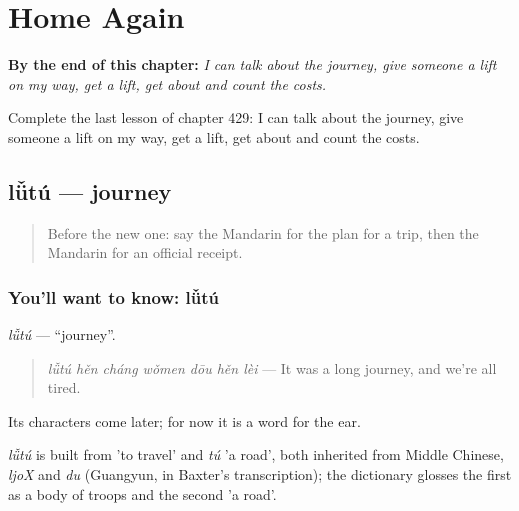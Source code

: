 
\chapter{Home Again}
\label{ch:zh-home-again}

\begin{chapteropening}
\textbf{By the end of this chapter:} \emph{I can talk about the journey, give someone a lift on my way, get a lift, get about and count the costs.}

Complete the last lesson of chapter 429: I can talk about the journey, give someone a lift on my way, get a lift, get about and count the costs.
\end{chapteropening}

\section[lǚtú]{lǚtú — journey}

\label{lesson:ZH-C429-lutu}



\begin{quote}
Before the new one: say the Mandarin for the plan for a trip, then the Mandarin for an official receipt.
\end{quote}

\subsection*{You'll want to know: lǚtú}
\emph{lǚtú} — \textquotedblleft{}journey\textquotedblright{}.

\begin{quote}
\emph{lǚtú hěn cháng wǒmen dōu hěn lèi} — It was a long journey, and we're all tired.
\end{quote}

Its characters come later; for now it is a word for the ear.

\begin{cousinweb}
\emph{lǚtú} is built from  'to travel' and \emph{tú} 'a road', both inherited from Middle Chinese, \emph{ljoX} and \emph{du} (Guangyun, in Baxter's transcription); the dictionary glosses the first as a body of troops and the second 'a road'.
\end{cousinweb}

